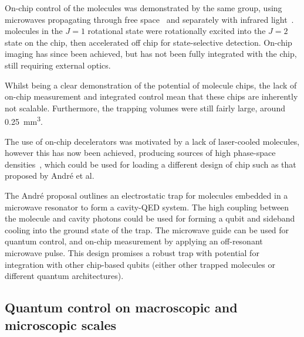 On-chip control of the molecules was demonstrated by the same group, using
microwaves propagating through free space~\cite{doi:10.1002/cphc.201001007} and
separately with infrared light~\cite{doi:10.1080/00268976.2012.683885}.  \CO{}
molecules in the $J=1$ rotational state were rotationally excited into the $J=2$
state on the chip, then accelerated off chip for state-selective detection.
On-chip imaging has since been achieved, but has not been fully integrated with
the chip, still requiring external optics.~\cite{Marx2013}

Whilst being a clear demonstration of the potential of
molecule chips, the lack of on-chip measurement and integrated control mean that
these chips are inherently not scalable.  Furthermore, the trapping volumes were
still fairly large, around \SI{0.25}{\milli\metre\cubed}. 
%

%
The use of on-chip decelerators was motivated by a lack of laser-cooled
molecules, however this has now been achieved, producing sources of high
phase-space densities~\cite{Truppe2017}, which could be used for loading a
different design of chip such as that proposed by Andr\'e et
al.~\cite{Andre2006}

The Andr\'e proposal outlines an electrostatic trap for molecules embedded in a
microwave resonator to form a cavity-QED system. The high coupling between the
molecule and cavity photons could be used for forming a qubit and sideband
cooling into the ground state of the trap. The microwave guide can be used for
quantum control, and on-chip measurement by applying an off-resonant microwave
pulse. This design promises a robust trap with potential for integration with
other chip-based qubits (either other trapped molecules or different quantum
architectures).

\subsection{Quantum control on macroscopic and microscopic scales}
\label{chiptraps:control}


